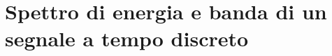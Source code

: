 \documentclass[../main.tex]{subfiles}
\begin{document}


\clearpage
\thispagestyle{empty}
\vspace*{7cm}
\section{Spettro di energia e banda di un segnale a tempo discreto}
\vspace*{1.5cm}

\end{document}
